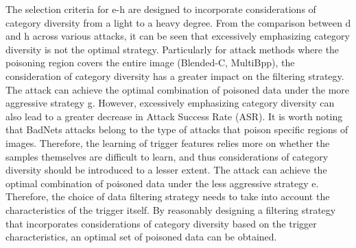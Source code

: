 \documentclass{article}
\begin{document}
The selection criteria for e-h are designed to incorporate considerations of category diversity from a light to a heavy degree. From the comparison between d and h across various attacks, it can be seen that excessively emphasizing category diversity is not the optimal strategy. Particularly for attack methods where the poisoning region covers the entire image (Blended-C, MultiBpp), the consideration of category diversity has a greater impact on the filtering strategy. The attack can achieve the optimal combination of poisoned data under the more aggressive strategy g. However, excessively emphasizing category diversity can also lead to a greater decrease in Attack Success Rate (ASR). It is worth noting that BadNets attacks belong to the type of attacks that poison specific regions of images. Therefore, the learning of trigger features relies more on whether the samples themselves are difficult to learn, and thus considerations of category diversity should be introduced to a lesser extent. The attack can achieve the optimal combination of poisoned data under the less aggressive strategy e. Therefore, the choice of data filtering strategy needs to take into account the characteristics of the trigger itself. By reasonably designing a filtering strategy that incorporates considerations of category diversity based on the trigger characteristics, an optimal set of poisoned data can be obtained.
\end{document}
